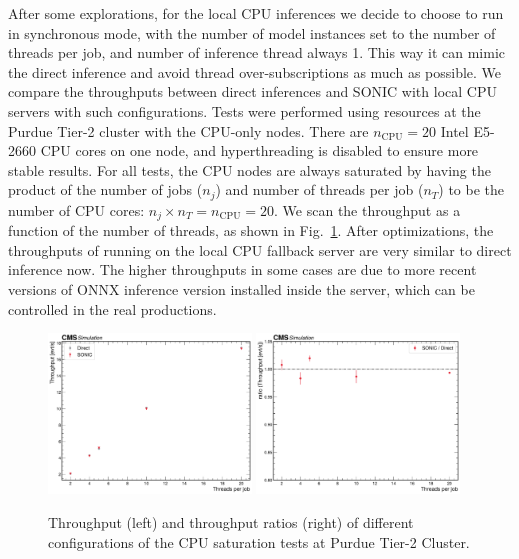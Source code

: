 After some explorations, for the local CPU inferences we decide to choose to run in synchronous mode, with the number of model instances set to the number of threads per job, and number of inference thread always 1. This way it can mimic the direct inference and avoid thread over-subscriptions as much as possible. We compare the throughputs between direct inferences and SONIC with local CPU servers with such configurations. Tests were performed using resources at the Purdue Tier-2 cluster with the CPU-only nodes. There are $n_{\text{CPU}}=20$ Intel E5-2660 CPU cores on one node, and hyperthreading is disabled to ensure more stable results. For all tests, the CPU nodes are always saturated by having the product of the number of jobs ($n_j$) and number of threads per job ($n_T$) to be the number of CPU cores: $n_j\times n_T = n_{\text{CPU}} = 20$. We scan the throughput as a function of the number of threads, as shown in Fig.~\ref{fig:throughput_cpu}. After optimizations, the throughputs of running on the local CPU fallback server are very similar to direct inference now. The higher throughputs in some cases are due to more recent versions of ONNX inference version installed inside the server, which can be controlled in the real productions.

\begin{figure}
    \centering
    \includegraphics[width=0.48\textwidth]{plots/threads_vs_throughput.pdf}
    \includegraphics[width=0.48\textwidth]{plots/threads_vs_throughput__ratio.pdf}
    \caption{Throughput (left) and throughput ratios (right) of different configurations of the CPU saturation tests at Purdue Tier-2 Cluster.}
    \label{fig:throughput_cpu}
\end{figure}


